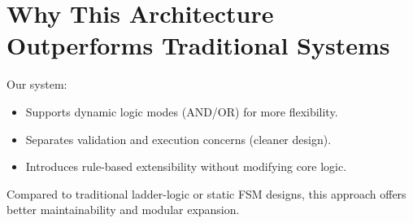 \section*{Why This Architecture Outperforms Traditional Systems}

Our system:
\begin{itemize}
  \item Supports dynamic logic modes (AND/OR) for more flexibility.
  \item Separates validation and execution concerns (cleaner design).
  \item Introduces rule-based extensibility without modifying core logic.
\end{itemize}

Compared to traditional ladder-logic or static FSM designs, this approach offers better maintainability and modular expansion.
